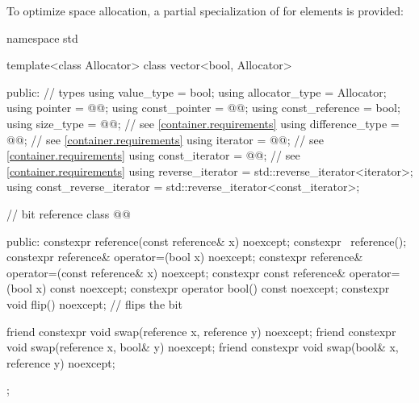 \pnum
{}%
To optimize space allocation, a partial specialization of  for
 elements is provided:
\begin{codeblock}
namespace std {
  template<class Allocator>
  class vector<bool, Allocator> {
  public:
    // types
    using value_type             = bool;
    using allocator_type         = Allocator;
    using pointer                = @@;
    using const_pointer          = @@;
    using const_reference        = bool;
    using size_type              = @@; // see \ref{container.requirements}
    using difference_type        = @@; // see \ref{container.requirements}
    using iterator               = @@; // see \ref{container.requirements}
    using const_iterator         = @@; // see \ref{container.requirements}
    using reverse_iterator       = std::reverse_iterator<iterator>;
    using const_reverse_iterator = std::reverse_iterator<const_iterator>;

    // bit reference
    class @@ {
    public:
      constexpr reference(const reference& x) noexcept;
      constexpr ~reference();
      constexpr reference& operator=(bool x) noexcept;
      constexpr reference& operator=(const reference& x) noexcept;
      constexpr const reference& operator=(bool x) const noexcept;
      constexpr operator bool() const noexcept;
      constexpr void flip() noexcept;   // flips the bit

      friend constexpr void swap(reference x, reference y) noexcept;
      friend constexpr void swap(reference x, bool& y) noexcept;
      friend constexpr void swap(bool& x, reference y) noexcept;
    };

}}
\end{codeblock}
